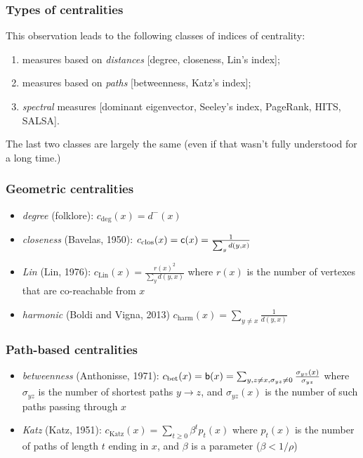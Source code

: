 \begin{frame}
  \frametitle{Types of centralities}
  This observation leads to the following classes of indices of centrality:
  \begin{enumerate}
    \pause
    \item measures based on \emph{distances} [degree, closeness, Lin's index];
    \pause
    \item measures based on \emph{paths} [betweenness, Katz's index];
    \pause
    \item \emph{spectral} measures [dominant eigenvector, Seeley's index,
      PageRank, HITS, SALSA].
  \end{enumerate}
  \vfill
  \pause
  The last two classes are largely the same (even if that wasn't fully
  understood for a long time.)
\end{frame}

\begin{frame}
  \frametitle{Geometric centralities}
  \begin{itemize}
    \pause
    \item \emph{degree} (folklore): $c_{\mathrm{deg}}(x)=d^-(x)$
    \pause
    \item \emph{closeness} (Bavelas, 1950):
      $c_{\mathrm{clos}}(x)=\mathsf{c}(x)=\frac1{\sum_y d(y,x)}$
    \pause
    \item \emph{Lin} (Lin, 1976): $c_{\mathrm{Lin}}(x)=\frac{r(x)^2}{\sum_y
      d(y,x)}$ where $r(x)$ is the number of vertexes that are co-reachable from
      $x$
    \pause
    \item \emph{harmonic} (Boldi and Vigna, 2013)
      $c_{\mathrm{harm}}(x)=\sum_{y\neq x}\frac1{d(y,x)}$
  \end{itemize}
\end{frame}

\begin{frame}
  \frametitle{Path-based centralities}
  \begin{itemize}
    \pause
    \item \emph{betweenness} (Anthonisse, 1971):
      $c_{\mathrm{bet}}(x)=\mathsf{b}(x)=\sum_{y,z \neq x,\sigma_{yz}\neq 0} \frac{\sigma_{yz}(x)}{\sigma_{yz}}$ where $\sigma_{yz}$ is the number of shortest paths $y \to z$, and $\sigma_{yz}(x)$ is the number of such paths passing through $x$
    \pause
    \item \emph{Katz} (Katz, 1951): $c_{\mathrm{Katz}}(x)=\sum_{t\geq 0} \beta^t
      p_t(x)$ where $p_t(x)$ is the number of paths of length $t$ ending in $x$,
      and $\beta$ is a parameter ($\beta<1/\rho$)
  \end{itemize}
\end{frame}

